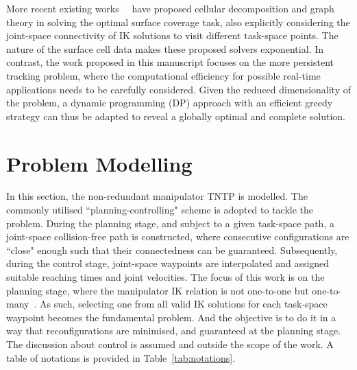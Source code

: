 \documentclass[letterpaper, 10 pt, conference]{ieeeconf}  %
\begin{document}
More recent existing works~\cite{Yang2020Cellular}~\cite{Yang2020Nonrevisiting} have proposed cellular decomposition and graph theory
in solving the optimal surface coverage task, also explicitly considering the joint-space connectivity of IK solutions to visit different task-space points. 
The nature of the surface cell data makes these proposed solvers exponential. 
In contrast, the work proposed in this manuscript focuses on the more persistent tracking problem, where the computational efficiency for possible real-time applications needs to be carefully considered. Given the reduced dimensionality of the problem, a dynamic programming (DP) approach with an efficient greedy strategy can thus be adapted to reveal a globally optimal and complete solution. 


\section{Problem Modelling}\label{section:modelling}
In this section, the non-redundant manipulator TNTP is modelled. The commonly utilised ``planning-controlling" scheme is adopted to tackle the problem. During the planning stage, 
and subject to a given task-space path, a joint-space collision-free path is constructed, where consecutive configurations are ``close" enough such that their connectedness can be guaranteed. 
Subsequently, during the control stage, joint-space waypoints are interpolated and assigned suitable reaching times and joint velocities. 
The focus of this work is on the planning stage, where the manipulator IK relation is not one-to-one but one-to-many~\cite{Lavalle2006Planning}. 
As such, selecting one from all valid IK solutions for each task-space waypoint becomes the fundamental problem. And the objective is to do it in a way that reconfigurations are minimised, and guaranteed at the planning stage. 
The discussion about control is assumed and outside the scope of the work. 
A table of notations is provided in Table~\ref{tab:notations}.
\end{document}
